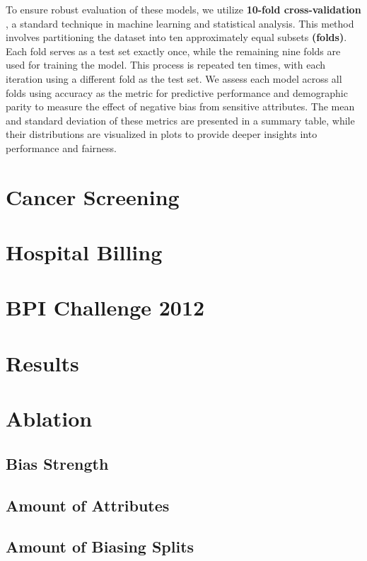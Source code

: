 To ensure robust evaluation of these models, we utilize \textbf{10-fold cross-validation} \cite{10_fold},
a standard technique in machine learning and statistical analysis.
This method involves partitioning the dataset into ten approximately equal subsets \textbf{(folds)}.
Each fold serves as a test set exactly once, while the remaining nine folds are used for training the model.
This process is repeated ten times, with each iteration using a different fold as the test set.
We assess each model across all folds using accuracy as the metric for predictive performance
and demographic parity to measure the effect of negative bias from sensitive attributes.
The mean and standard deviation of these metrics are presented in a summary table,
while their distributions are visualized in plots to provide deeper insights into performance and fairness.

\section{Cancer Screening}

\section{Hospital Billing}



\section{BPI Challenge 2012}

\section{Results}

\section{Ablation}

\subsection{Bias Strength}

\subsection{Amount of Attributes}

\subsection{Amount of Biasing Splits}